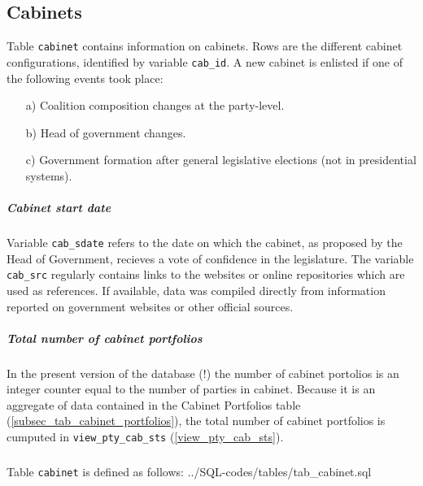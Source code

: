 \subsection{Cabinets}\label{subsec_tab_cabinet}

Table \texttt{cabinet} contains information on cabinets.
Rows are the different cabinet configurations, identified by variable \texttt{cab\_id}. 
A new cabinet is enlisted if one of the following events took place:
\begin{itemize}\label{cabinet_change_criteria}\itemsep-4pt 
\item[a)] Coalition composition changes at the party-level.
\item[b)] Head of government changes.
\item[c)] Government formation after general legislative elections (not in presidential systems).
\end{itemize}

\subparagraph{Cabinet start date} Variable \texttt{cab\_sdate} refers to the date on which the cabinet, as proposed by the Head of Government, recieves a vote of confidence in the legislature. The variable \texttt{cab\_src} regularly contains links to the websites or online repositories which are used as references. If available, data was compiled directly from information reported on government websites or other official sources.

\subparagraph{Total number of cabinet portfolios} In the present version of the database (!) the number of cabinet portolios is an integer counter equal to the number of parties in cabinet. 
Because it is an aggregate of data contained in the Cabinet Portfolios table (\ref{subsec_tab_cabinet_portfolios}), the total number of cabinet portfolios is cumputed in \texttt{view\_pty\_cab\_sts} (\ref{view_pty_cab_sts}).


\subparagraph{}
Table \texttt{cabinet} is defined as follows:
%
{../SQL-codes/tables/tab_cabinet.sql}

